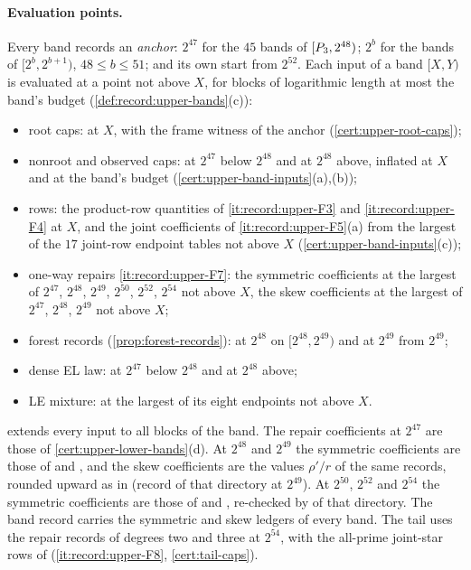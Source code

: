 \paragraph{Evaluation points.}
Every band records an \emph{anchor}: $2^{47}$ for the $45$ bands of
$[P_3,2^{48})$; $2^b$ for the bands of $[2^b,2^{b+1})$, $48\le b\le51$; and its
own start from $2^{52}$. Each input of a band $[X,Y)$ is evaluated at a point not
above $X$, for blocks of logarithmic length at most the band's budget
(\cref{def:record:upper-bands}(c)):
\begin{itemize}
\item root caps: at $X$, with the frame witness of the anchor
 (\cref{cert:upper-root-caps});
\item nonroot and observed caps: at $2^{47}$ below $2^{48}$ and at $2^{48}$ above,
 inflated at $X$ and at the band's budget (\cref{cert:upper-band-inputs}(a),(b));
\item rows: the product-row quantities of \ref{it:record:upper-F3} and
 \ref{it:record:upper-F4} at $X$, and the joint coefficients of
 \ref{it:record:upper-F5}(a) from the largest of the $17$ joint-row endpoint tables
 not above $X$ (\cref{cert:upper-band-inputs}(c));
\item one-way repairs \ref{it:record:upper-F7}: the symmetric coefficients at the
 largest of $2^{47}$, $2^{48}$, $2^{49}$, $2^{50}$, $2^{52}$, $2^{54}$ not above $X$,
 the skew coefficients at the largest of $2^{47}$, $2^{48}$, $2^{49}$ not above $X$;
\item forest records (\cref{prop:forest-records}): at $2^{48}$ on $[2^{48},2^{49})$
 and at $2^{49}$ from $2^{49}$;
\item dense EL law: at $2^{47}$ below $2^{48}$ and at $2^{48}$ above;
\item LE mixture: at the largest of its eight endpoints not above $X$.
\end{itemize}
 extends every input to all blocks of the band. The repair
coefficients at $2^{47}$ are those of \cref{cert:upper-lower-bands}(d). At $2^{48}$
and $2^{49}$ the symmetric coefficients are those of
 and
, and the skew coefficients are the values $\rho'/r$
of the same records, rounded upward as in
 (record
 of that directory at $2^{49}$). At $2^{50}$, $2^{52}$ and
$2^{54}$ the symmetric coefficients are those of
 and
, re-checked by
 of that directory. The band record
 carries the
symmetric and skew ledgers of every band. The tail uses the repair records of
degrees two and three at $2^{54}$, with the all-prime joint-star rows of
 (\ref{it:record:upper-F8}, \cref{cert:tail-caps}).


